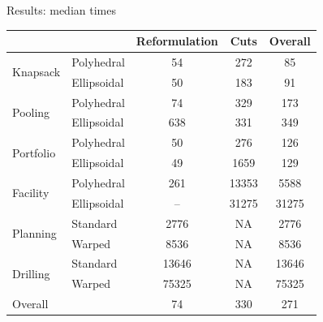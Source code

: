 \documentclass[slides,aspectratio=169]{beamer}
\begin{document}
\begin{frame}{Results: median times}
    \small
    \centering
\begin{tabular}{l l c c c}
                               &             & Reformulation    & Cuts & Overall \\ \hline
    \multirow{2}{*}{Knapsack}  & Polyhedral  & \phantom{601}54  & \phantom{40}272 & \phantom{753}85      \\
                               \cline{2-5}
                               & Ellipsoidal & \phantom{601}50  & \phantom{40}183 & \phantom{753}91      \\
    \hline
    \multirow{2}{*}{Pooling}   & Polyhedral  & \phantom{601}74  & \phantom{40}329 & \phantom{75}173     \\
                               \cline{2-5}
                               & Ellipsoidal & \phantom{60}638  & \phantom{40}331 & \phantom{75}349    \\
    \hline
    \multirow{2}{*}{Portfolio} & Polyhedral  & \phantom{601}50  & \phantom{40}276 & \phantom{75}126      \\
                               \cline{2-5}
                               & Ellipsoidal & \phantom{601}49  & \phantom{4}1659 & \phantom{75}129      \\
    \hline
    \multirow{2}{*}{Facility}  & Polyhedral  & \phantom{60}261  & 13353           & \phantom{7}5588\\
                               \cline{2-5}
                               & Ellipsoidal & \phantom{601}--  & 31275           & 31275\\
    \hline
    \multirow{2}{*}{Planning}  & Standard    & \phantom{6}2776  & \phantom{400}NA & \phantom{7}2776\\
                               \cline{2-5}
                               & Warped      & \phantom{6}8536  & \phantom{400}NA & \phantom{7}8536\\
    \hline
    \multirow{2}{*}{Drilling}  & Standard    & 13646            & \phantom{400}NA & 13646 \\
                               \cline{2-5}
                               & Warped      & 75325            & \phantom{400}NA & 75325\\
    \hline
                        Overall&             & \phantom{601}74  & \phantom{40}330 & \phantom{75}271     \\
    \hline
\end{tabular}
\end{frame}
\end{document}
